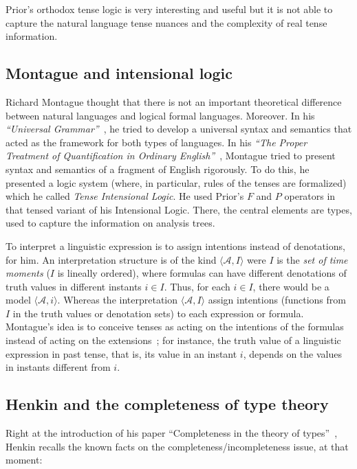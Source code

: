 Prior's orthodox tense logic is very interesting and useful but it is not
able to capture the natural language tense nuances and the complexity of
real tense information.

\subsection{Montague and intensional logic}

Richard Montague thought that there is not an important theoretical
difference between natural languages and logical formal languages. Moreover.
In his \emph{``Universal 
Grammar''}~\cite{Montague1970}, he tried to develop a universal syntax and semantics that
acted as the framework for both types of languages. In his
\emph{``The Proper Treatment of Quantification in Ordinary
English''}~\cite{Montague1973}, Montague tried to present
syntax and semantics of a fragment of English rigorously. To do this, he
presented a logic system (where, in particular, rules of the tenses are
formalized) which he called \emph{Tense Intensional Logic}. He used Prior's 
$F$ and $P$ operators in that tensed variant of his Intensional Logic. There,
the central elements are types, used to capture the information on analysis
trees.

To interpret a linguistic expression is to assign intentions instead of
denotations, for him. An interpretation structure is of the kind 
$\langle \mathcal{A},I\rangle$ were $I$ is the \emph{set of
time moments} ($I$ is lineally ordered), where formulas can have different
denotations of truth values in different instants $i\in I$. Thus, for each 
$i\in I$, there would be a model $\langle \mathcal{A},i\rangle$.
Whereas the interpretation $\langle \mathcal{A},I\rangle $ assign
intentions (functions from $I$ in the truth values or denotation sets) to
each expression or formula. Montague's idea is to conceive tenses as acting
on the intentions of the formulas instead of acting on the 
extensions~\cite{Montague1973}; for instance, the truth value of a linguistic expression in
past tense, that is, its value in an instant $i$, depends on the values in
instants different from $i$.

\subsection{Henkin and the completeness of type theory}

Right at the introduction of his paper ``Completeness in the
theory of types''~\cite{Henkin1950}, Henkin recalls the
known facts on the completeness/incompleteness issue, at that moment:

